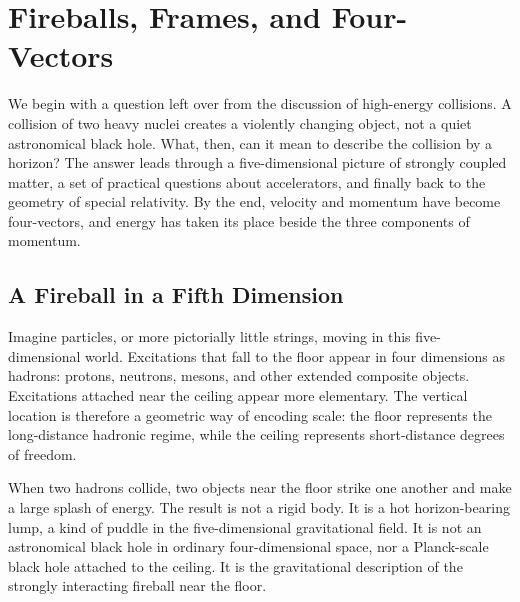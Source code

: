 \chapter{Fireballs, Frames, and Four-Vectors}

We begin with a question left over from the discussion of high-energy
collisions. A collision of two heavy nuclei creates a violently changing
object, not a quiet astronomical black hole. What, then, can it mean to
describe the collision by a horizon? The answer leads through a
five-dimensional picture of strongly coupled matter, a set of practical
questions about accelerators, and finally back to the geometry of special
relativity. By the end, velocity and momentum have become four-vectors, and
energy has taken its place beside the three components of momentum.

\section{A Fireball in a Fifth Dimension}

\begin{classroomqa}
\end{classroomqa}

Imagine particles, or more pictorially little strings, moving in this
five-dimensional world. Excitations that fall to the floor appear in four
dimensions as hadrons: protons, neutrons, mesons, and other extended composite
objects. Excitations attached near the ceiling appear more elementary. The
vertical location is therefore a geometric way of encoding scale: the floor
represents the long-distance hadronic regime, while the ceiling represents
short-distance degrees of freedom.

When two hadrons collide, two objects near the floor strike one another and
make a large splash of energy. The result is not a rigid body. It is a hot
horizon-bearing lump, a kind of puddle in the five-dimensional gravitational
field. It is not an astronomical black hole in ordinary four-dimensional
space, nor a Planck-scale black hole attached to the ceiling. It is the
gravitational description of the strongly interacting fireball near the
floor.

